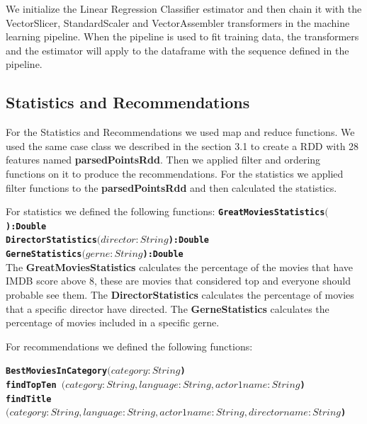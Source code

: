 \documentclass[letterpaper,twocolumn,10pt]{article}
\begin{document}
We initialize the Linear Regression Classifier estimator and then chain it with the VectorSlicer, StandardScaler and VectorAssembler transformers in the machine learning pipeline. When the pipeline is used to fit training data, the transformers and the estimator will apply to the dataframe with the sequence defined in the pipeline.\par 

\subsection{Statistics and Recommendations}

For the Statistics and Recommendations we used map and reduce functions. We used the same case class we described in the section 3.1 to create a RDD with 28 features named \textbf{parsedPointsRdd}. Then we applied filter and ordering functions on it to produce the recommendations. For the statistics we applied filter functions to the \textbf{parsedPointsRdd} and then calculated the statistics. \par 

For statistics we defined the following functions:
\noindent
{\bf \tt GreatMoviesStatistics\((\)):Double } \\ 

\noindent
{\bf \tt DirectorStatistics\((director:String\)):Double } \\ 

\noindent
{\bf \tt GerneStatistics\((gerne:String\)):Double } \\ 

The \textbf{GreatMoviesStatistics} calculates the percentage of the movies that have IMDB score above 8, these are movies that considered top and everyone should probable see them. The \textbf{DirectorStatistics} calculates the percentage of movies that a specific director have directed. The \textbf{GerneStatistics} calculates the percentage of movies included in a specific gerne. \par


For recommendations we defined the following functions:

\noindent
{\bf \tt BestMoviesInCategory\((category:String\)) } \\

\noindent
{\bf \tt findTopTen  \((category:String,language:String,actor1name:String\)) } \\

\noindent
{\bf \tt findTitle\((category:String, language:String, actor1name:String, directorname:String\)) } \\
\end{document}
